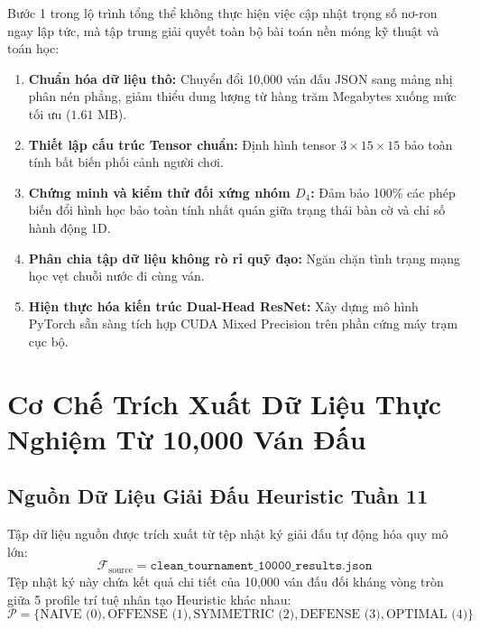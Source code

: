 \documentclass[11pt,a4paper]{report}
\begin{document}
Bước 1 trong lộ trình tổng thể không thực hiện việc cập nhật trọng số nơ-ron ngay lập tức, mà tập trung giải quyết toàn bộ bài toán nền móng kỹ thuật và toán học:
\begin{enumerate}
    \item \textbf{Chuẩn hóa dữ liệu thô:} Chuyển đổi 10,000 ván đấu JSON sang mảng nhị phân nén phẳng, giảm thiểu dung lượng từ hàng trăm Megabytes xuống mức tối ưu ($1.61\text{ MB}$).
    \item \textbf{Thiết lập cấu trúc Tensor chuẩn:} Định hình tensor $3 \times 15 \times 15$ bảo toàn tính bất biến phối cảnh người chơi.
    \item \textbf{Chứng minh và kiểm thử đối xứng nhóm $D_4$:} Đảm bảo 100\% các phép biến đổi hình học bảo toàn tính nhất quán giữa trạng thái bàn cờ và chỉ số hành động 1D.
    \item \textbf{Phân chia tập dữ liệu không rò rỉ quỹ đạo:} Ngăn chặn tình trạng mạng học vẹt chuỗi nước đi cùng ván.
    \item \textbf{Hiện thực hóa kiến trúc Dual-Head ResNet:} Xây dựng mô hình PyTorch sẵn sàng tích hợp CUDA Mixed Precision trên phần cứng máy trạm cục bộ.
\end{enumerate}

\chapter{Cơ Chế Trích Xuất Dữ Liệu Thực Nghiệm Từ 10,000 Ván Đấu}

\section{Nguồn Dữ Liệu Giải Đấu Heuristic Tuần 11}

Tập dữ liệu nguồn được trích xuất từ tệp nhật ký giải đấu tự động hóa quy mô lớn:
\begin{equation}
    \mathcal{F}_{\text{source}} = \texttt{clean\_tournament\_10000\_results.json}
\end{equation}
Tệp nhật ký này chứa kết quả chi tiết của 10,000 ván đấu đối kháng vòng tròn giữa 5 profile trí tuệ nhân tạo Heuristic khác nhau:
\begin{equation}
    \mathcal{P} = \{\text{NAIVE (0)}, \text{OFFENSE (1)}, \text{SYMMETRIC (2)}, \text{DEFENSE (3)}, \text{OPTIMAL (4)}\}
\end{equation}
\end{document}
